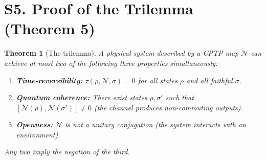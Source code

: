 \documentclass[prl,twocolumn,superscriptaddress,longbibliography]{revtex4-2}
\newtheorem{theorem}{Theorem}
\newcommand{\chan}{\mathcal{N}}
\newcommand{\tauasym}{\tau}
\begin{document}
\section{S5. Proof of the Trilemma (Theorem 5)}
\label{sec:thm5}

\begin{theorem}[The trilemma]
\label{thm:trilemma}
A physical system described by a CPTP map $\chan$ can achieve at most
two of the following three properties simultaneously:
\begin{enumerate}
\item[\emph{(i)}] \textbf{Time-reversibility:}
  $\tauasym(\rho, \chan, \sigma) = 0$ for all states $\rho$
  and all faithful $\sigma$.
\item[\emph{(ii)}] \textbf{Quantum coherence:} There exist states
  $\rho, \sigma'$ such that
  $[\chan(\rho), \chan(\sigma')] \neq 0$
  (the channel produces non-commuting outputs).
\item[\emph{(iii)}] \textbf{Openness:} $\chan$ is not a unitary
  conjugation (the system interacts with an environment).
\end{enumerate}
Any two imply the negation of the third.
\end{theorem}
\end{document}
